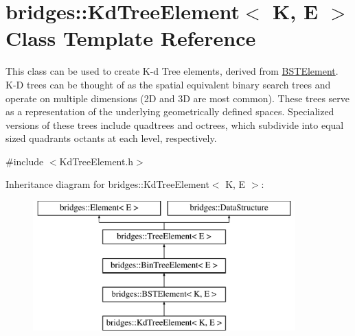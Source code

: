\hypertarget{classbridges_1_1_kd_tree_element}{}\section{bridges\+:\+:Kd\+Tree\+Element$<$ K, E $>$ Class Template Reference}
\label{classbridges_1_1_kd_tree_element}


This class can be used to create K-\/d Tree elements, derived from \hyperlink{classbridges_1_1_b_s_t_element}{B\+S\+T\+Element}. K-\/\+D trees can be thought of as the spatial equivalent binary search trees and operate on multiple dimensions (2\+D and 3\+D are most common). These trees serve as a representation of the underlying geometrically defined spaces. Specialized versions of these trees include quadtrees and octrees, which subdivide into equal sized quadrants octants at each level, respectively.  




{\ttfamily \#include $<$Kd\+Tree\+Element.\+h$>$}

Inheritance diagram for bridges\+:\+:Kd\+Tree\+Element$<$ K, E $>$\+:\begin{figure}[H]
\begin{center}
\leavevmode
\includegraphics[height=5.000000cm]{classbridges_1_1_kd_tree_element}
\end{center}
\end{figure}
